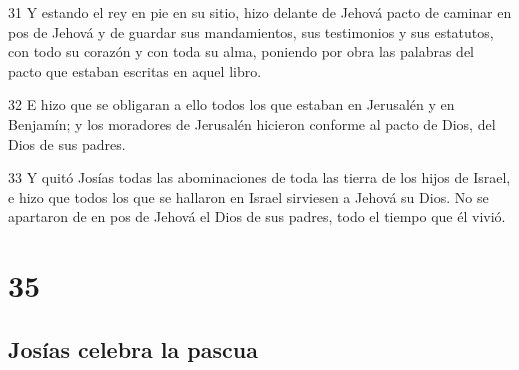 \par 31 Y estando el rey en pie en su sitio, hizo delante de Jehová pacto de caminar en pos de Jehová y de guardar sus mandamientos, sus testimonios y sus estatutos, con todo su corazón y con toda su alma, poniendo por obra las palabras del pacto que estaban escritas en aquel libro.
\par 32 E hizo que se obligaran a ello todos los que estaban en Jerusalén  y en Benjamín; y los moradores de Jerusalén  hicieron conforme al pacto de Dios, del Dios de sus padres.
\par 33 Y quitó Josías todas las abominaciones de toda las tierra de los hijos de Israel, e hizo que todos los que se hallaron en Israel sirviesen a Jehová su Dios. No se apartaron de en pos de Jehová el Dios de sus padres, todo el tiempo que él vivió.

\chapter{35}

\section*{Josías celebra la pascua}

